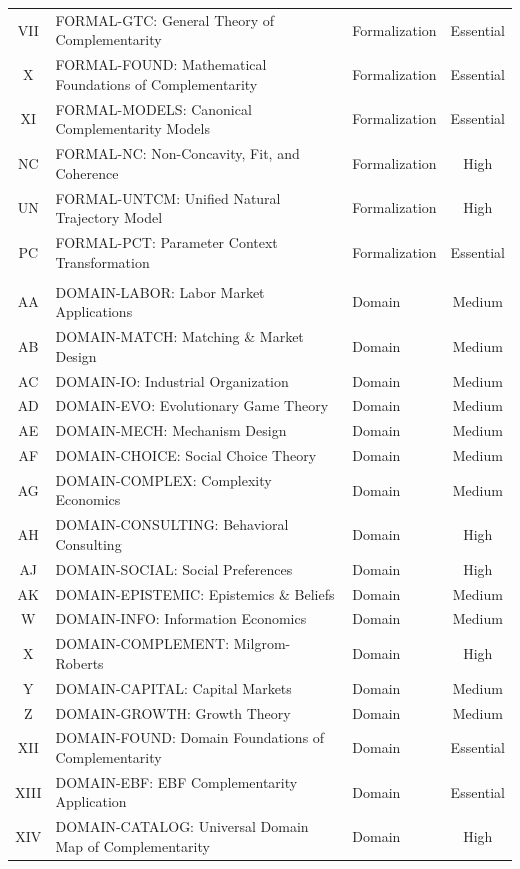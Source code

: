 \begin{table}[htbp]
\begin{tabular}{@{}cllc@{}}
VII & FORMAL-GTC: General Theory of Complementarity & Formalization & Essential \\
X & FORMAL-FOUND: Mathematical Foundations of Complementarity & Formalization & Essential \\
XI & FORMAL-MODELS: Canonical Complementarity Models & Formalization & Essential \\
NC & FORMAL-NC: Non-Concavity, Fit, and Coherence & Formalization & High \\
UN & FORMAL-UNTCM: Unified Natural Trajectory Model & Formalization & High \\
PC & FORMAL-PCT: Parameter Context Transformation & Formalization & Essential \\
\addlinespace
\multicolumn{4}{@{}l}{\textit{\textbf{DOMAIN (17)}}} \\
AA & DOMAIN-LABOR: Labor Market Applications & Domain & Medium \\
AB & DOMAIN-MATCH: Matching \& Market Design & Domain & Medium \\
AC & DOMAIN-IO: Industrial Organization & Domain & Medium \\
AD & DOMAIN-EVO: Evolutionary Game Theory & Domain & Medium \\
AE & DOMAIN-MECH: Mechanism Design & Domain & Medium \\
AF & DOMAIN-CHOICE: Social Choice Theory & Domain & Medium \\
AG & DOMAIN-COMPLEX: Complexity Economics & Domain & Medium \\
AH & DOMAIN-CONSULTING: Behavioral Consulting & Domain & High \\
AJ & DOMAIN-SOCIAL: Social Preferences & Domain & High \\
AK & DOMAIN-EPISTEMIC: Epistemics \& Beliefs & Domain & Medium \\
W & DOMAIN-INFO: Information Economics & Domain & Medium \\
X & DOMAIN-COMPLEMENT: Milgrom-Roberts & Domain & High \\
Y & DOMAIN-CAPITAL: Capital Markets & Domain & Medium \\
Z & DOMAIN-GROWTH: Growth Theory & Domain & Medium \\
XII & DOMAIN-FOUND: Domain Foundations of Complementarity & Domain & Essential \\
XIII & DOMAIN-EBF: EBF Complementarity Application & Domain & Essential \\
XIV & DOMAIN-CATALOG: Universal Domain Map of Complementarity & Domain & High \\

\end{tabular}
\end{table}
